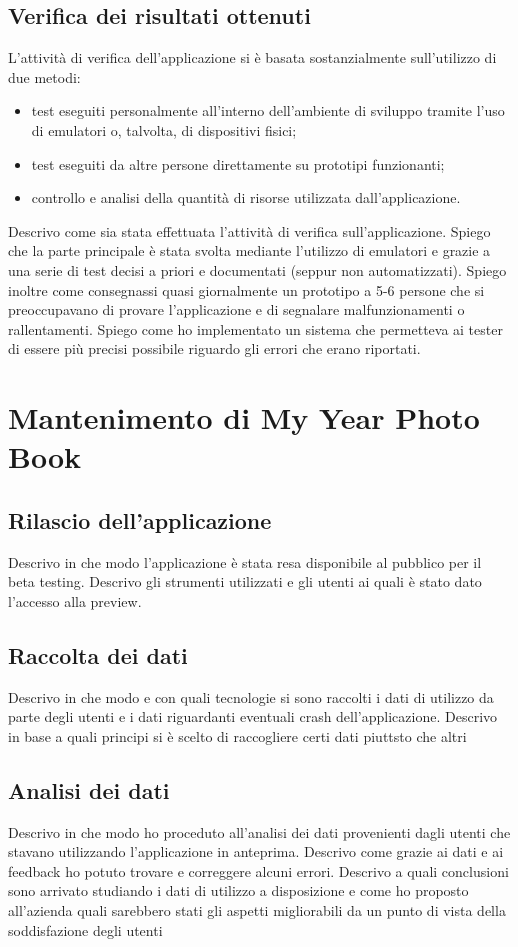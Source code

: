 		\subsection{Verifica dei risultati ottenuti}
			L'attività di verifica dell'applicazione si è basata sostanzialmente sull'utilizzo di due metodi:
			\begin{itemize}
				\item test eseguiti personalmente all'interno dell'ambiente di sviluppo tramite l'uso di emulatori o, talvolta, di
				dispositivi fisici;
				\item test eseguiti da altre persone direttamente su prototipi funzionanti;
				\item controllo e analisi della quantità di risorse utilizzata dall'applicazione.
			\end{itemize}
			
			Descrivo come sia stata effettuata l'attività di verifica sull'applicazione. Spiego che la parte principale è stata
			svolta mediante l'utilizzo di emulatori e grazie a una serie di test decisi a priori e documentati (seppur non
			automatizzati). Spiego inoltre come consegnassi quasi giornalmente un prototipo a 5-6 persone che si preoccupavano
			di provare l'applicazione e di segnalare malfunzionamenti o rallentamenti. Spiego come ho implementato un sistema
			che permetteva ai tester di essere più precisi possibile riguardo gli errori che erano riportati.
	\section{Mantenimento di My Year Photo Book}
		\subsection{Rilascio dell'applicazione}
			Descrivo in che modo l'applicazione è stata resa disponibile al pubblico per il beta testing. Descrivo gli strumenti
			utilizzati e gli utenti ai quali è stato dato l'accesso alla preview.
		\subsection{Raccolta dei dati}
			Descrivo in che modo e con quali tecnologie si sono raccolti i dati di utilizzo da parte degli utenti e i dati riguardanti
			eventuali crash dell'applicazione. Descrivo in base a quali principi si è scelto di raccogliere certi dati piuttsto che altri
		\subsection{Analisi dei dati}
			Descrivo in che modo ho proceduto all'analisi dei dati provenienti dagli utenti che stavano utilizzando l'applicazione in
			anteprima. Descrivo come grazie ai dati e ai feedback ho potuto trovare e correggere alcuni errori. Descrivo a quali
			conclusioni sono arrivato studiando i dati di utilizzo a disposizione e come ho proposto all'azienda quali sarebbero stati
			gli aspetti migliorabili da un punto di vista della soddisfazione degli utenti
